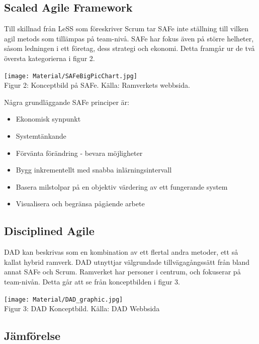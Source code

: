 	\subsection{Scaled Agile Framework}
		
		Till skillnad från LeSS som föreskriver Scrum tar SAFe inte ställning till vilken agil metods som tillämpas på team-nivå.
		SAFe har fokus även på större helheter, såsom ledningen i ett företag, dess strategi och ekonomi. Detta framgår ur de två översta kategorierna i figur 2. \cite{safe_intro}
		
		\begin{center}
			\texttt{[image: Material/SAFeBigPicChart.jpg]}
			\\ Figur 2: Konceptbild på SAFe. Källa: Ramverkets webbsida. \cite{safe_web}
		\end{center}
		Några grundläggande SAFe principer är: \cite{safe_principles}
		\begin{itemize}
			\item Ekonomisk synpunkt
			\item Systemtänkande
			\item Förvänta förändring - bevara möjligheter
			\item Bygg inkrementellt med snabba inlärningsintervall
			\item Basera milstolpar på en objektiv värdering av ett fungerande system
			\item Visualisera och begränsa pågående arbete
		\end{itemize}
			
		
	\subsection{Disciplined Agile}
			
			DAD kan beskrivas som en kombination av ett flertal andra metoder, ett så kallat hybrid ramverk. DAD utnyttjar välgrundade tillvägagångssätt från bland annat SAFe och Scrum.
			Ramverket har personer i centrum, och fokuserar på team-nivån. Detta går att se från konceptbilden i figur 3. \cite{dad_overview}
		
		\begin{center}
			\texttt{[image: Material/DAD\_graphic.jpg]}
			\\ Figur 3: DAD Konceptbild. Källa: DAD Webbsida \cite{dad_web}
		\end{center}
		
	
	\subsection{Jämförelse}
	
